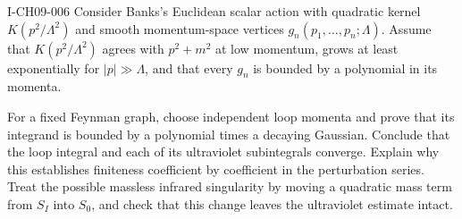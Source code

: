 \begin{exercise}{I-CH09-006}
Consider Banks's Euclidean scalar action with quadratic kernel
$K(p^2/\Lambda^2)$ and smooth momentum-space vertices
$g_n(p_1,\ldots,p_n;\Lambda)$.  Assume that $K(p^2/\Lambda^2)$ agrees with
$p^2+m^2$ at low momentum, grows at least exponentially for
$|p|\gg\Lambda$, and that every $g_n$ is bounded by a polynomial in its
momenta.

For a fixed Feynman graph, choose independent loop momenta and prove that its
integrand is bounded by a polynomial times a decaying Gaussian.  Conclude
that the loop integral and each of its ultraviolet subintegrals converge.
Explain why this establishes finiteness coefficient by coefficient in the
perturbation series.  Treat the possible massless infrared singularity by
moving a quadratic mass term from $S_I$ into $S_0$, and check that this change
leaves the ultraviolet estimate intact.
\end{exercise}
